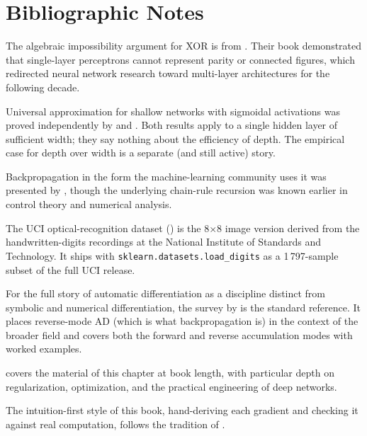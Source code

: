 
\section*{Bibliographic Notes}

The algebraic impossibility argument for XOR is from
\textcite{minsky1969perceptrons}. Their book demonstrated that
single-layer perceptrons cannot represent parity or connected figures,
which redirected neural network research toward multi-layer
architectures for the following decade.

Universal approximation for shallow networks with sigmoidal activations
was proved independently by \textcite{cybenko1989} and
\textcite{hornik1989}. Both results apply to a single hidden layer of
sufficient width; they say nothing about the efficiency of depth. The
empirical case for depth over width is a separate (and still active)
story.

Backpropagation in the form the machine-learning community uses it was
presented by \textcite{rumelhart1986backprop}, though the underlying
chain-rule recursion was known earlier in control theory and
numerical analysis.

The UCI optical-recognition dataset (\cite{uci1998digits}) is the
8$\times$8 image version derived from the handwritten-digits recordings
at the National Institute of Standards and Technology. It ships with
\texttt{sklearn.datasets.load\_digits} as a 1\,797-sample subset of the
full UCI release.

For the full story of automatic differentiation as a discipline distinct
from symbolic and numerical differentiation, the survey by
\textcite{baydin2018autodiff} is the standard reference. It places
reverse-mode AD (which is what backpropagation is) in the context of
the broader field and covers both the forward and reverse accumulation
modes with worked examples.

\textcite{goodfellow2016dlbook} covers the material of this chapter at
book length, with particular depth on regularization, optimization, and
the practical engineering of deep networks.

The intuition-first style of this book, hand-deriving each gradient and
checking it against real computation, follows the tradition of
\textcite{mackay2003information}.
